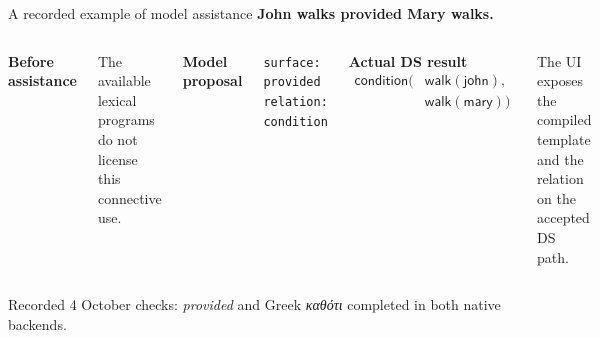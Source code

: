 \documentclass[aspectratio=169,11pt]{beamer}
\newcommand{\tagline}[1]{{\small\color{Accent}\bfseries #1}\par\medskip}
\newcommand{\aside}[1]{\par{\small\color{Muted}#1}\par}
\newcommand{\keypoint}[1]{\begin{block}{}#1\end{block}}
\newcommand{\code}[1]{\texttt{#1}}
\newcommand{\pred}[1]{\mathsf{#1}}
\begin{document}
\begin{frame}{A recorded example of model assistance}
  \color{Ink}
  \tagline{John walks provided Mary walks.}
  \begin{columns}[T,onlytextwidth]
      \textbf{Before assistance}\medskip
      \aside{The available lexical programs do not license this connective use.}
      \medskip\textbf{Model proposal}\medskip
      \begin{block}{}\code{surface: provided}\\\code{relation: condition}\end{block}
      \textbf{Actual DS result}\medskip
      \[\begin{aligned}
        \pred{condition}(&\pred{walk}(\pred{john}),\\[-1mm]
                         &\pred{walk}(\pred{mary}))
      \end{aligned}\]
      \aside{The UI exposes the compiled template and the relation on the accepted DS path.}
  \end{columns}
  \vspace{3mm}
  \keypoint{Recorded 4 October checks: \emph{provided} and Greek \emph{καθότι} completed in both native backends.}
\end{frame}
\end{document}
